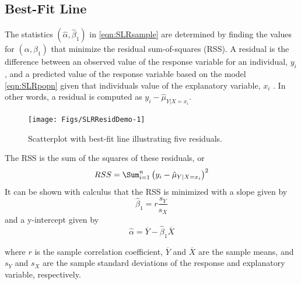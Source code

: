 \documentclass[10pt,openany]{book}\usepackage[]{graphicx}\usepackage[]{color}
\newenvironment{knitrout}{}{} %
\begin{document}
\subsection{Best-Fit Line}
The statistics $(\hat{\alpha}, \hat{\beta}_{1})$ in \eqref{eqn:SLRsample} are determined by finding the values for $(\alpha, \beta_{1})$ that minimize the residual sum-of-squares (RSS).  A residual is the difference between an observed value of the response variable for an individual, $y_{i}$, and a predicted value of the response variable based on the model \eqref{eqn:SLRpopn} given that individuals value of the explanatory variable, $x_{i}$ .  In other words, a residual is computed as $y_{i}-\hat{\mu}_{Y|X=x_{i}}$.

\begin{knitrout}
\color{fgcolor}\begin{figure}[h]

{\centering \texttt{[image: Figs/SLRResidDemo-1]} 

}

\caption[Scatterplot with best-fit line illustrating five residuals]{Scatterplot with best-fit line illustrating five residuals.}\label{fig:SLRResidDemo}
\end{figure}


\end{knitrout}


The RSS is the sum of the squares of these residuals, or
\[ RSS = \Sum_{i=1}^{n}\left(y_{i}-\hat{\mu}_{Y|X=x_{i}}\right)^{2} \]
It can be shown with calculus that the RSS is minimized with a slope given by
\[ \hat{\beta}_{1} = r\frac{s_{Y}}{s_{X}} \]
and a y-intercept given by
\begin{equation}\label{eqn:SLRintercept}
    \hat{\alpha} = \overline{Y} - \hat{\beta}_{1}\overline{X}
\end{equation}

where $r$ is the sample correlation coefficient, $\overline{Y}$ and $\overline{X}$ are the sample means, and $s_{Y}$ and $s_{X}$ are the sample standard deviations of the response and explanatory variable, respectively.


\vspace{-12pt}
\end{document}
